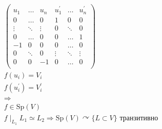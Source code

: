 \begin{gather*}
	\begin{pmatrix}
		u_1 & \ldots & u_n & u_1^{\prime} & \ldots & u_n^{\prime}\\
		0 & \ldots & 0 & 1 & 0 & 0\\
		\vdots & \ddots & \vdots & 0 & \ddots & 0\\
		0 & \ldots & 0 & 0 & \ldots & 1\\
		-1 & 0 & 0 & 0 & \ldots & 0\\
		0 & \ddots & 0 & \vdots & \ddots & \vdots \\
		0 & 0 & -1 & 0 & \ldots & 0\\
	\end{pmatrix}\\
	f(u_i) = V_i\\
	f(u_i^{\prime}) = V_i^{\prime}\\
	\Rightarrow\\
	f \in \text{Sp}(V)\\
	f \mid_{L_1} L_1 \simeq L_2 \Rightarrow \text{Sp}(V) \curvearrowright \{L \subset V\} \text{ транзитивно}
\end{gather*}
